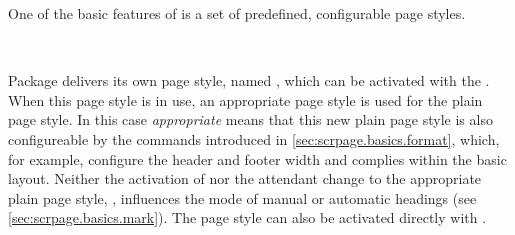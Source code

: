 One of the basic features of  is a set of predefined,
configurable page styles.


\begin{Declaration}
  \\
\end{Declaration}%
%
%
%
%
Package  delivers its own page style, named
, which can be activated with the
. When this page style is in use, an
appropriate  page style is used for the plain page style.
In this case \emph{appropriate} means that this new plain page style is also
configureable by the commands introduced in
\autoref{sec:scrpage.basics.format}, which, for example, configure the header
and footer width and complies within the basic layout. Neither the activation
of  nor the attendant change to the appropriate plain
page style, , influences the mode of manual or automatic
headings (see
\autoref{sec:scrpage.basics.mark}). The  page style can
also be activated directly with .

